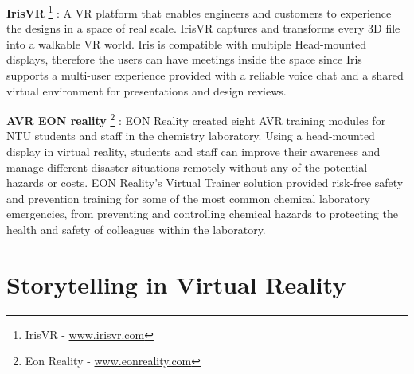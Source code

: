 \textbf{IrisVR} \footnote{IrisVR - \url{www.irisvr.com}} : A VR platform that enables engineers and customers to experience the designs in a space of real scale. IrisVR captures and transforms every 3D file into a walkable VR world. Iris is compatible with multiple Head-mounted displays, therefore the users can have meetings inside the space since Iris supports a multi-user experience provided with a reliable voice chat and a shared virtual environment for presentations and design reviews.


\textbf{AVR EON reality} \footnote{Eon Reality - \url{www.eonreality.com}} : EON Reality created eight AVR training modules for NTU students and staff in the chemistry laboratory. Using a head-mounted display in virtual reality, students and staff can improve their awareness and manage different disaster situations remotely without any of the potential hazards or costs. EON Reality's Virtual Trainer solution provided risk-free safety and prevention training for some of the most common chemical laboratory emergencies, from preventing and controlling chemical hazards to protecting the health and safety of colleagues within the laboratory.

\section{Storytelling in Virtual Reality}

